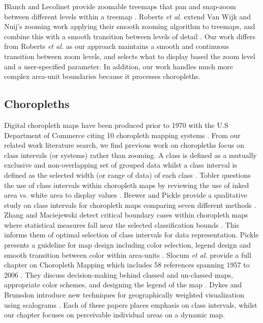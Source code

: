 Blanch and Lecolinet provide zoomable treemaps that pan and snap-zoom between different levels within a treemap \cite{blanch2007browsing}. Roberts \textit{et al.} extend Van Wijk and Nuij's zooming work applying their smooth zooming algorithm to treemaps, and combine this with a smooth transition between levels of detail \cite{roberts2016interactive}. Our work differs from Roberts \textit{et al.} as our approach maintains a smooth and continuous transition between zoom levels, and selects what to display based the zoom level and a user-specified parameter. In addition, our work handles much more complex area-unit boundaries because it processes choropleths.


\subsection{Choropleths}
Digital choropleth maps have been produced prior to  1970 with the U.S Department of Commerce citing 10 choropleth mapping systems \cite{us1970use}. From our related work literature search, we find previous work on choropleths focus on class intervals (or systems) rather than zooming. A class is defined as a mutually exclusive and non-overlapping set of grouped data whilst a class interval is defined as the selected width (or range of data) of each class \cite{hooda1994statistics}. Tobler questions the use of class intervals within choropleth maps by reviewing the use of inked area vs. white area to display values \cite{tobler1973choropleth}. Brewer and Pickle provide a qualitative study on class intervals for choropleth maps comparing seven different methods \cite{brewer2002evaluation}. Zhang and Maciejewski detect critical boundary cases within choropleth maps where statistical measures fall near the selected classification bounds \cite{zhang2017quantifying}. This informs them of optimal selection of class intervals for data representation. Pickle presents a guideline for map design including color selection, legend design and smooth transition between color within area-units \cite{pickle2003usability}. Slocum \textit{et al.} provide a full chapter on Choropleth Mapping which includes 58 references \cite{slocum2009thematic} spanning 1957 \cite{stevens1957ratio} to 2006 \cite{anselin2006geoda}. They discuss decision-making behind classed and un-classed maps, appropriate color schemes, and designing the legend of the map \cite{slocum2009thematic}. Dykes and Brunsdon introduce new techniques for geographically weighted visualization using scalograms \cite{dykes2007geographically}. Each of these papers places emphasis on class intervals, whilst our chapter focuses on perceivable individual areas on a dynamic map.

